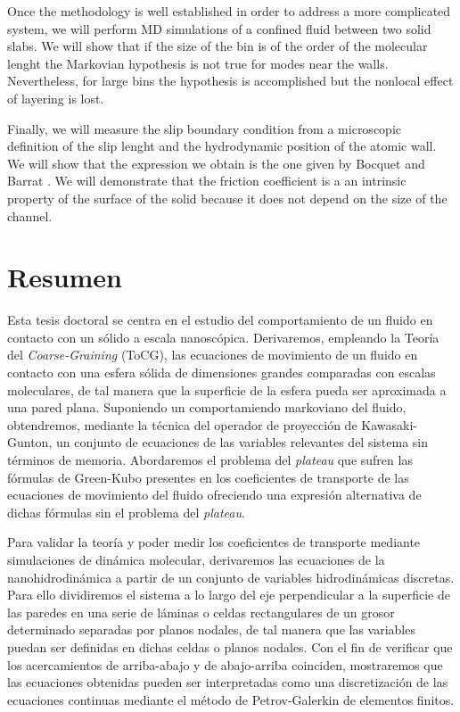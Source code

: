\documentclass[b5paper,openright,10pt]{book}
\begin{document}
Once the methodology is well established in order to address a more complicated system, we will perform MD simulations of a confined fluid between two solid slabs. We will show that if the size of the bin is of the order of the molecular lenght the Markovian hypothesis is not true for modes near the walls. Nevertheless, for large bins the hypothesis is accomplished but the nonlocal effect of layering is lost. 

Finally, we will measure the slip boundary condition from a microscopic definition of the slip lenght and the hydrodynamic position of the atomic wall. We will show that the expression we obtain is the one given by Bocquet and Barrat \cite{Bocquet1994}. We will demonstrate that the friction coefficient is a an intrinsic property of the surface of the solid because it does not depend on the size of the channel. 

\chapter*{Resumen} %
Esta tesis doctoral se centra en el estudio del comportamiento de un fluido en contacto con un sólido a escala nanoscópica. 
Derivaremos, empleando la Teoría del \textit{Coarse-Graining} (ToCG), las ecuaciones de movimiento de un fluido en contacto con una esfera sólida de dimensiones grandes comparadas con escalas moleculares, de tal manera que la superficie de la esfera pueda ser aproximada a una pared plana. 
Suponiendo un comportamiendo markoviano del fluido, obtendremos, mediante la técnica del operador de proyección de Kawasaki-Gunton, un conjunto de ecuaciones de las variables relevantes del sistema sin términos de memoria. 
Abordaremos el problema del \textit{plateau} que sufren las fórmulas de Green-Kubo presentes en los coeficientes de transporte de las ecuaciones de movimiento del fluido ofreciendo una expresión alternativa de dichas fórmulas sin el problema del \textit{plateau}.  

Para validar la teoría y poder medir los coeficientes de transporte mediante simulaciones de dinámica molecular, derivaremos las ecuaciones de la nanohidrodinámica a partir de un conjunto de variables hidrodinámicas discretas. 
Para ello dividiremos el sistema a lo largo del eje perpendicular a la superficie de las paredes en una serie de láminas o celdas rectangulares de un grosor determinado separadas por planos nodales, de tal manera que las variables puedan ser definidas en dichas celdas o planos nodales.  
Con el fin de verificar que los acercamientos de arriba-abajo y de abajo-arriba coinciden, mostraremos que las ecuaciones obtenidas pueden ser interpretadas como una discretización de las ecuaciones continuas mediante el método de Petrov-Galerkin de elementos finitos.  
\end{document}
